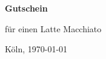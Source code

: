 \documentclass[16pt,ngerman]{scrartcl}
\begin{document}
\centering\Huge

\textbf{Gutschein}
\vspace{20mm}
\begin{center}
für einen Latte Macchiato
\end{center}
\vspace{1cm}\huge

\vspace{2cm}\LARGE\flushleft

Köln, \today \hfill\hdashrule[0.15ex]{9.5cm}{1pt}{2mm}



\begin{center}
\vfill{}
\end{center}
\end{document}
